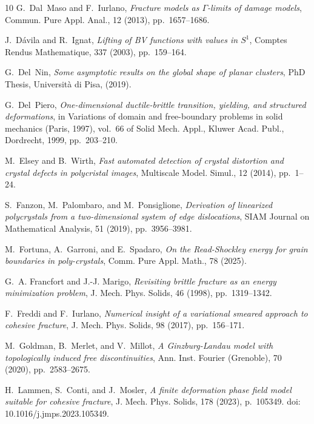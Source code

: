 \documentclass[a4paper,reqno]{amsart}
\theoremstyle{remark}
\numberwithin{equation}{section}
\begin{document}
\begin{thebibliography}{10}
{\sc G.~Dal~Maso and F.~Iurlano}, {\em Fracture models as {$\Gamma$}-limits of
  damage models}, Commun. Pure Appl. Anal., 12 (2013), pp.~1657--1686.

{\sc J.~D{\'a}vila and R.~Ignat}, {\em Lifting of {BV} functions with values in
  {$S^1$}}, Comptes Rendus Mathematique, 337 (2003), pp.~159--164.

{\sc G.~Del~Nin}, {\em Some asymptotic results on the global shape of planar
  clusters}, PhD Thesis, Università di Pisa,  (2019).

{\sc G.~Del~Piero}, {\em One-dimensional ductile-brittle transition, yielding,
  and structured deformations}, in Variations of domain and free-boundary
  problems in solid mechanics ({P}aris, 1997), vol.~66 of Solid Mech. Appl.,
  Kluwer Acad. Publ., Dordrecht, 1999, pp.~203--210.

{\sc M.~Elsey and B.~Wirth}, {\em Fast automated detection of crystal
  distortion and crystal defects in polycristal images}, Multiscale Model.
  Simul., 12 (2014), pp.~1--24.

{\sc S.~Fanzon, M.~Palombaro, and M.~Ponsiglione}, {\em Derivation of
  linearized polycrystals from a two-dimensional system of edge dislocations},
  SIAM Journal on Mathematical Analysis, 51 (2019), pp.~3956--3981.

{\sc M.~Fortuna, A.~Garroni, and E.~Spadaro}, {\em On the {Read-Shockley}
  energy for grain boundaries in poly-crystals}, Comm. Pure Appl. Math., 78
  (2025).

{\sc G.~A. Francfort and J.-J. Marigo}, {\em Revisiting brittle fracture as an
  energy minimization problem}, J. Mech. Phys. Solids, 46 (1998),
  pp.~1319--1342.

{\sc F.~Freddi and F.~Iurlano}, {\em Numerical insight of a variational smeared
  approach to cohesive fracture}, J. Mech. Phys. Solids, 98 (2017),
  pp.~156--171.

{\sc M.~Goldman, B.~Merlet, and V.~Millot}, {\em A {G}inzburg-{L}andau model
  with topologically induced free discontinuities}, Ann. Inst. Fourier
  (Grenoble), 70 (2020), pp.~2583--2675.

{\sc H.~Lammen, S.~Conti, and J.~Mosler}, {\em A finite deformation phase field
  model suitable for cohesive fracture}, J. Mech. Phys. Solids, 178 (2023),
  p.~105349.
\newblock doi: 10.1016/j.jmps.2023.105349.


\end{thebibliography}
\end{document}
